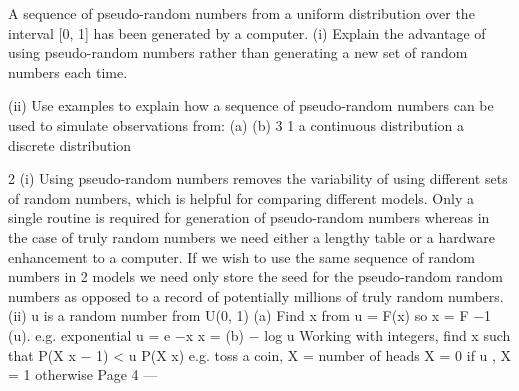 \documentclass[a4paper,12pt]{article}
\begin{document}
 

A sequence of pseudo-random numbers from a uniform distribution over the interval
[0, 1] has been generated by a computer.
(i) Explain the advantage of using pseudo-random numbers rather than generating
a new set of random numbers each time.

(ii) Use examples to explain how a sequence of pseudo-random numbers can be
used to simulate observations from:
(a)
(b)
3
1
a continuous distribution
a discrete distribution


\newpage


2
(i)
Using pseudo-random numbers removes the variability of using different sets of random numbers, which is helpful for comparing different models.
Only a single routine is required for generation of pseudo-random numbers whereas in the case of truly random numbers we need either a lengthy table or
a hardware enhancement to a computer.
If we wish to use the same sequence of random numbers in 2 models we need only store the seed for the pseudo-random random numbers as opposed to a
record of potentially millions of truly random numbers.
(ii)
u is a random number from U(0, 1)
(a)
Find x from u = F(x)
so x = F −1 (u).
e.g. exponential u = e −\lambda x
x =
(b)
− log u
\lambda 
Working with integers, find x such that P(X \leq  x − 1) < u \leq  P(X \leq  x)
e.g. toss a coin, X = number of heads
X = 0 if u , X = 1 otherwise
Page 4 — %
\end{document}
